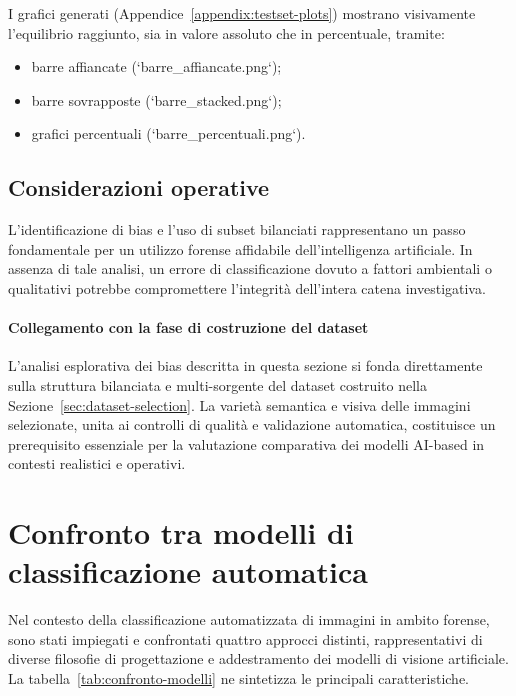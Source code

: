 I grafici generati (Appendice~\ref{appendix:testset-plots}) mostrano visivamente l'equilibrio raggiunto, sia in valore assoluto che in percentuale, tramite:
\begin{itemize}
  \item barre affiancate (`barre\_affiancate.png`);
  \item barre sovrapposte (`barre\_stacked.png`);
  \item grafici percentuali (`barre\_percentuali.png`).
\end{itemize}

\subsection{Considerazioni operative}
L’identificazione di bias e l’uso di subset bilanciati rappresentano un passo fondamentale per un utilizzo forense affidabile dell’intelligenza artificiale. In assenza di tale analisi, un errore di classificazione dovuto a fattori ambientali o qualitativi potrebbe compromettere l'integrità dell'intera catena investigativa.



\paragraph{Collegamento con la fase di costruzione del dataset}
L’analisi esplorativa dei bias descritta in questa sezione si fonda direttamente sulla struttura bilanciata e multi-sorgente del dataset costruito nella Sezione~\ref{sec:dataset-selection}. La varietà semantica e visiva delle immagini selezionate, unita ai controlli di qualità e validazione automatica, costituisce un prerequisito essenziale per la valutazione comparativa dei modelli AI-based in contesti realistici e operativi.




\section{Confronto tra modelli di classificazione automatica}
\label{sec:confronto-modelli}

Nel contesto della classificazione automatizzata di immagini in ambito forense, sono stati impiegati e confrontati quattro approcci distinti, rappresentativi di diverse filosofie di progettazione e addestramento dei modelli di visione artificiale. La tabella~\ref{tab:confronto-modelli} ne sintetizza le principali caratteristiche.

